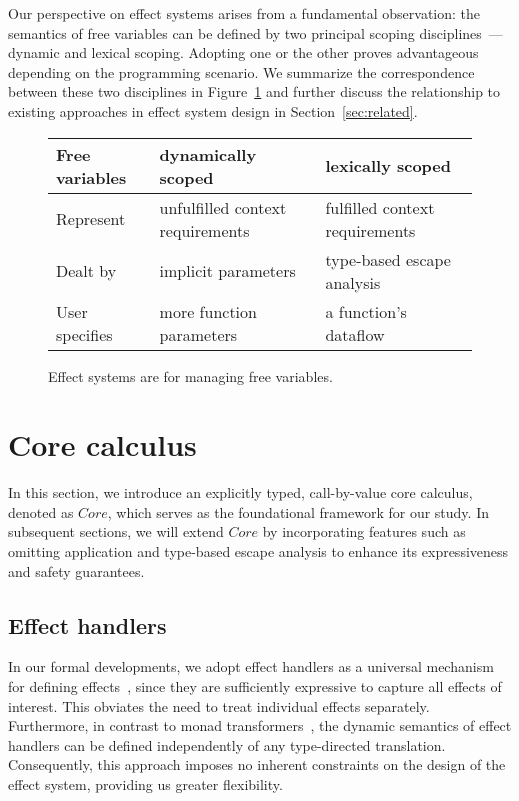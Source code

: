 \documentclass[acmsmall]{acmart}
\begin{document}
Our perspective on effect systems arises from a fundamental observation: the semantics of free variables can be defined by two principal scoping disciplines~--- dynamic and lexical scoping.
Adopting one or the other proves advantageous depending on the programming scenario.
We summarize the correspondence between these two disciplines in Figure~\ref{fig:free-vars} and further discuss the relationship to existing approaches in effect system design in Section~\ref{sec:related}.

\begin{figure}
    \centering
    \begin{tabular}{|l|l|l|}
        \hline
        Free variables & dynamically scoped & lexically scoped \\
        \hline
        Represent & unfulfilled context requirements & fulfilled context requirements \\
        Dealt by & implicit parameters & type-based escape analysis \\
        User specifies & more function parameters & a function’s dataflow \\ %
        \hline
    \end{tabular}
    \caption{Effect systems are for managing free variables.}
    \label{fig:free-vars}
\end{figure}


\section{Core calculus} \label{sec:core}

In this section, we introduce an explicitly typed, call-by-value core calculus, denoted as $Core$, which serves as the foundational framework for our study.
In subsequent sections, we will extend $Core$ by incorporating features such as omitting application and type-based escape analysis to enhance its expressiveness and safety guarantees.

\subsection{Effect handlers} \label{subsec:handlers}

In our formal developments, we adopt effect handlers as a universal mechanism for defining effects~\cite{plotkin2003algebraic, plotkin2013handling}, since they are sufficiently expressive to capture all effects of interest.
This obviates the need to treat individual effects separately.
Furthermore, in contrast to monad transformers~\cite{liang1995monad, schrijvers2019monad}, the dynamic semantics of effect handlers can be defined independently of any type-directed translation.
Consequently, this approach imposes no inherent constraints on the design of the effect system, providing us greater flexibility.
\end{document}
